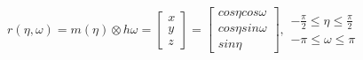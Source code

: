 \begin{equation}
 \begin{aligned}
r(\eta,\omega) = m(\eta) \otimes h\omega =\begin{bmatrix}
x          \\[0.3em]
y          \\[0.3em]
z
\end{bmatrix} = 
\begin{bmatrix}
cos\eta cos\omega          \\[0.3em]
cos\eta sin \omega          \\[0.3em]
sin \eta
\end{bmatrix}, 
\begin{split}
-\frac{\pi}{2}\leq\eta\leq\frac{\pi}{2} \\  -\pi\leq\omega\leq\pi
\end{split}  
\end{aligned}
\end{equation}



